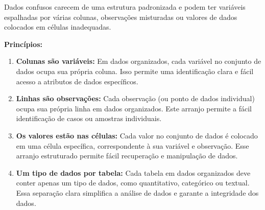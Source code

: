 \documentclass[
  letterpaper,
  DIV=11,
  numbers=noendperiod]{scrartcl}
\begin{document}
Dados confusos carecem de uma estrutura padronizada e podem ter
variáveis espalhadas por várias colunas, observações misturadas ou
valores de dados colocados em células inadequadas.

\textbf{Princípios:}

\begin{enumerate}
\def\labelenumi{\arabic{enumi}.}
\item
  \textbf{Colunas são variáveis:} Em dados organizados, cada variável no
  conjunto de dados ocupa sua própria coluna. Isso permite uma
  identificação clara e fácil acesso a atributos de dados específicos.
\item
  \textbf{Linhas são observações:} Cada observação (ou ponto de dados
  individual) ocupa sua própria linha em dados organizados. Este arranjo
  permite a fácil identificação de casos ou amostras individuais.
\item
  \textbf{Os valores estão nas células:} Cada valor no conjunto de dados
  é colocado em uma célula específica, correspondente à sua variável e
  observação. Esse arranjo estruturado permite fácil recuperação e
  manipulação de dados.
\item
  \textbf{Um tipo de dados por tabela:} Cada tabela em dados organizados
  deve conter apenas um tipo de dados, como quantitativo, categórico ou
  textual. Essa separação clara simplifica a análise de dados e garante
  a integridade dos dados.
\end{enumerate}
\end{document}
